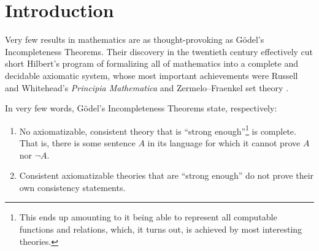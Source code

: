 \chapter*{Introduction}

Very few results in mathematics are as thought-provoking as
Gödel's Incompleteness Theorems. Their discovery in the twentieth
century effectively cut short Hilbert's program of formalizing
all of mathematics into a complete and decidable axiomatic
system, whose most important achievements were Russell and
Whitehead's \textit{Principia Mathematica} and Zermelo--Fraenkel
set theory \cite{Zach2021}.

In very few words, Gödel's Incompleteness Theorems state,
respectively:
\begin{enumerate}
    \item No axiomatizable, consistent theory that is
        \enquote{strong enough}\footnote{This ends up amounting
            to it being able to represent all computable
            functions and relations, which, it turns out, is
        achieved by most interesting theories.} is complete.
        That is, there is some sentence $A$ in its language for
        which it cannot prove $A$ nor $\lnot A$.
    \item Consistent axiomatizable theories that are
        \enquote{strong enough} do not prove their own
        consistency statements.
\end{enumerate}


